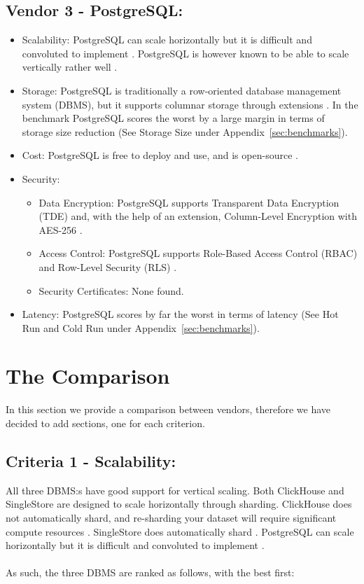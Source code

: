 \subsection{Vendor 3 - PostgreSQL:}
\begin{itemize}
    \item Scalability: PostgreSQL can scale horizontally but it is difficult and convoluted to implement \cite{postgresqlHorScaling}.
    PostgreSQL is however known to be able to scale vertically rather well \cite{postgresqlVerScaling}.
    \item Storage: PostgreSQL is traditionally a row-oriented database management system (DBMS), but it supports columnar storage through extensions \cite{postgresqlStorage}.
    In the benchmark PostgreSQL scores the worst by a large margin in terms of storage size reduction (See Storage Size under Appendix~\ref{sec:benchmarks}).
    \item Cost: PostgreSQL is free to deploy and use, and is open-source \cite{postgresqlCost}.
    \item Security:
    \begin{itemize}
        \item Data Encryption: PostgreSQL supports Transparent Data Encryption (TDE) \cite{postgresqlSecurity} and, with the help of an extension, Column-Level Encryption with AES-256 \cite{postgresqlSecurity2}.
        \item Access Control: PostgreSQL supports Role-Based Access Control (RBAC) \cite{postgresqlSecurity3} and Row-Level Security (RLS) \cite{postgresqlSecurity4}.
        \item Security Certificates: None found.
    \end{itemize}
    \item Latency: PostgreSQL scores by far the worst in terms of latency (See Hot Run and Cold Run under Appendix~\ref{sec:benchmarks}).
\end{itemize} 
\section{The Comparison}
In this section we provide a comparison between vendors, therefore we have decided to add sections, one for each criterion. 

\subsection{Criteria 1 - Scalability:}
All three DBMS:s have good support for vertical scaling.
Both ClickHouse and SingleStore are designed to scale horizontally through sharding. ClickHouse does not automatically shard, and re-sharding your dataset will require significant compute resources \cite{clickhouseScaling}. SingleStore does automatically shard \cite{SinglestoreSharding}. PostgreSQL can scale horizontally but it is difficult and convoluted to implement \cite{postgresqlHorScaling}.
\\\\
As such, the three DBMS are ranked as follows, with the best first:

